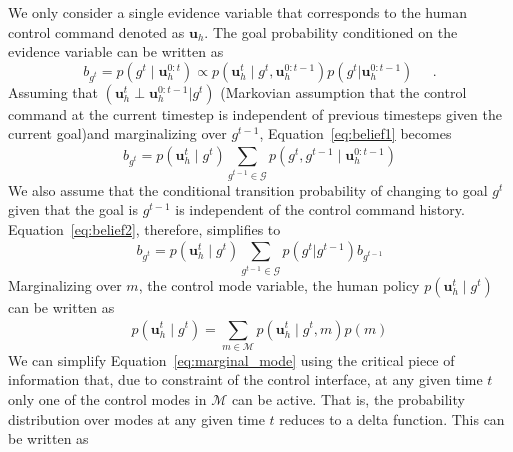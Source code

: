 \documentclass[conference]{IEEEtran}
\begin{document}
We only consider a single evidence variable that corresponds to the human control command denoted as $\boldsymbol{u}_h$. The goal probability conditioned on the evidence variable can be written as 
\begin{equation}\label{eq:belief1}
b_{g^t} = p(g^t \;|\; \boldsymbol{u}_h^{0:t}) \propto p(\boldsymbol{u}_h^t\;|\;g^t,\boldsymbol{u}_h^{0:t-1})p(g^t|\boldsymbol{u}_h^{0:t-1}) \;\;\;\;\;.
\end{equation}
Assuming that $(\boldsymbol{u}_h^t \perp \boldsymbol{u}_h^{0:t-1} | g^t)$ (Markovian assumption that the control command at the current timestep is independent of previous timesteps given the current goal)and marginalizing over $g^{t-1}$, Equation~\ref{eq:belief1} becomes
\begin{equation}\label{eq:belief2}
b_{g^t} = p(\boldsymbol{u}_h^t \;|\; g^t) \sum_{g^{t-1} \in \mathcal{G}}^{} p(g^t, g^{t-1} \; | \; \boldsymbol{u}_h^{0:t-1})
\end{equation}
We also assume that the conditional transition probability of changing to goal $g^t$ given that the goal is $g^{t-1}$ is independent of the control command history. Equation~\ref{eq:belief2}, therefore, simplifies to
\begin{equation}\label{eq:recursive_belief}
	b_{g^t} = p(\boldsymbol{u}_h^t \;|\; g^t) \sum_{g^{t-1} \in \mathcal{G}}^{} p(g^t | g^{t-1}) b_{g^{t-1}}
\end{equation}
Marginalizing over $m$, the control mode variable, the human policy $p(\boldsymbol{u}_h^t \;|\; g^t)$ can be written as 
\begin{equation} \label{eq:marginal_mode}
p(\boldsymbol{u}_h^t \;|\; g^t) = \sum_{m \in \mathcal{M}}^{} p(\boldsymbol{u}_h^t \;|\; g^t, m)p(m)
\end{equation}
We can simplify Equation~\ref{eq:marginal_mode} using the critical piece of information that, due to constraint of the control interface, at any given time $t$ only one of the control modes in $\mathcal{M}$ can be active. That is, the probability distribution over modes at any given time $t$ reduces to a delta function. This can be written as
\end{document}
